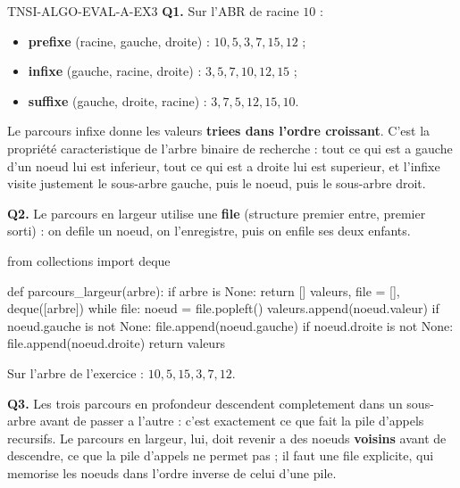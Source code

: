 \begin{corrige}{TNSI-ALGO-EVAL-A-EX3}
\textbf{Q1.} Sur l'ABR de racine $10$ :
\begin{itemize}
  \item \textbf{prefixe} (racine, gauche, droite) : $10, 5, 3, 7, 15, 12$ ;
  \item \textbf{infixe} (gauche, racine, droite) : $3, 5, 7, 10, 12, 15$ ;
  \item \textbf{suffixe} (gauche, droite, racine) : $3, 7, 5, 12, 15, 10$.
\end{itemize}
Le parcours infixe donne les valeurs \textbf{triees dans l'ordre croissant}. C'est la
propriété caracteristique de l'arbre binaire de recherche : tout ce qui est a gauche d'un
noeud lui est inferieur, tout ce qui est a droite lui est superieur, et l'infixe visite
justement le sous-arbre gauche, puis le noeud, puis le sous-arbre droit.

\textbf{Q2.} Le parcours en largeur utilise une \textbf{file} (structure premier entre,
premier sorti) : on defile un noeud, on l'enregistre, puis on enfile ses deux enfants.

\begin{python}
from collections import deque


def parcours_largeur(arbre):
    if arbre is None:
        return []
    valeurs, file = [], deque([arbre])
    while file:
        noeud = file.popleft()
        valeurs.append(noeud.valeur)
        if noeud.gauche is not None:
            file.append(noeud.gauche)
        if noeud.droite is not None:
            file.append(noeud.droite)
    return valeurs
\end{python}
Sur l'arbre de l'exercice : $10, 5, 15, 3, 7, 12$.

\textbf{Q3.} Les trois parcours en profondeur descendent completement dans un sous-arbre
avant de passer a l'autre : c'est exactement ce que fait la pile d'appels recursifs. Le
parcours en largeur, lui, doit revenir a des noeuds \textbf{voisins} avant de descendre,
ce que la pile d'appels ne permet pas ; il faut une file explicite, qui memorise les noeuds
dans l'ordre inverse de celui d'une pile.
\end{corrige}
